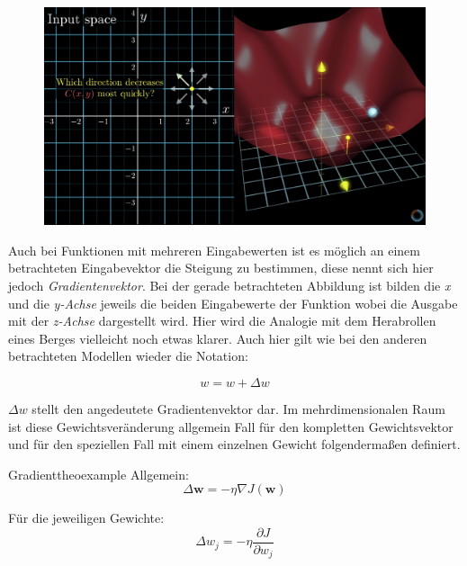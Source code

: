 \begin{figure}[!htb]
	\centering
	\includegraphics[width=\linewidth]{img/3dPlot_1}
	\label{fig:ad_gd3}
\end{figure}

Auch bei Funktionen mit mehreren Eingabewerten ist es möglich an einem betrachteten Eingabevektor die Steigung zu bestimmen, diese nennt sich hier jedoch \emph{Gradientenvektor}. Bei der gerade betrachteten Abbildung ist bilden die \emph{x} und die \emph{y-Achse} jeweils die beiden Eingabewerte der Funktion wobei die Ausgabe mit der \emph{z-Achse} dargestellt wird. Hier wird die Analogie mit dem Herabrollen eines Berges vielleicht noch etwas klarer. Auch hier gilt wie bei den anderen betrachteten Modellen wieder die Notation: 

\begin{equation} \label{eq:gewupd}
{w = w + \Delta w}
\end{equation}

${\Delta w}$ stellt den angedeutete Gradientenvektor dar. Im mehrdimensionalen Raum ist diese Gewichtsveränderung allgemein Fall für den kompletten Gewichtsvektor und für den speziellen Fall mit einem einzelnen Gewicht folgendermaßen definiert. 

\begin{mytheo}{Gradient}{theoexample} \label{theo:gradient1}
Allgemein: 
\begin{equation}
{\Delta \mathbf{w} = - \eta \nabla J(\mathbf{w})}
\end{equation}

Für die jeweiligen Gewichte: 
\begin{equation}
\Delta w_j = - \eta \frac{\partial J}{\partial w_j}
\end{equation}

\end{mytheo}

